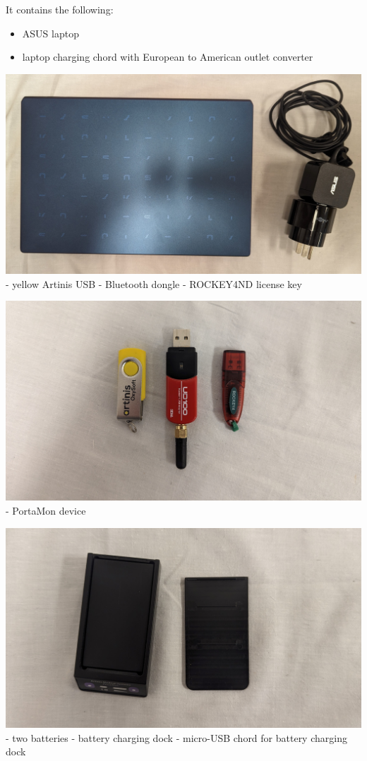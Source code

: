 \documentclass[
]{book}
\providecommand{\tightlist}{%
  \setlength{\itemsep}{0pt}\setlength{\parskip}{0pt}}
\begin{document}
It contains the following:

\begin{itemize}
\tightlist
\item
  ASUS laptop
\item
  laptop charging chord with European to American outlet converter
\end{itemize}

\includegraphics[width=1\linewidth]{images/asuslaptopandcharger}
- yellow Artinis USB
- Bluetooth dongle
- ROCKEY4ND license key

\includegraphics[width=1\linewidth]{images/laptopplugins}
- PortaMon device

\includegraphics[width=1\linewidth]{images/portamonopen}
- two batteries
- battery charging dock
- micro-USB chord for battery charging dock
\end{document}
